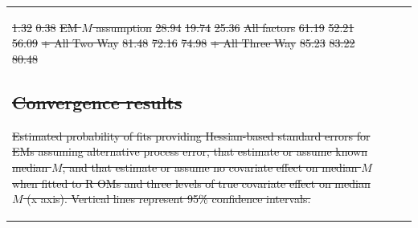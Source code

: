\documentclass[
  12pt,
]{article}
\makeatletter
\providecommand{\DIFdel}[1]{{\protect\color{red}\sout{#1}}} %
\providecommand{\DIFdelFL}[1]{\DIFdel{#1}} %
\let\sout@orig\sout %
\renewcommand{\sout}[1]{\ifmmode\text{\sout@orig{\ensuremath{#1}}}\else\sout@orig{#1}\fi} %
\makeatother
\begin{document}
\begin{table}
{\begin{center}
\begin{tabular}{lrrr}
\DIFdelFL{1.32}%
\DIFdelFL{0.38}%
\DIFdelFL{EM $M$ assumption}%
\DIFdelFL{28.94}%
\DIFdelFL{19.74}%
\DIFdelFL{25.36}%
\DIFdelFL{All factors}%
\DIFdelFL{61.19}%
\DIFdelFL{52.21}%
\DIFdelFL{56.09}%
\DIFdelFL{+ All Two Way}%
\DIFdelFL{81.48}%
\DIFdelFL{72.16}%
\DIFdelFL{74.98}%
\DIFdelFL{+ All Three Way}%
\DIFdelFL{85.23}%
\DIFdelFL{83.22}%
\DIFdelFL{80.48}%


\subsection*{\DIFdel{Convergence results}}%
\addcontentsline{toc}{subsection}{\DIFdel{Convergence results}}

{%
\DIFdelFL{Estimated probability of fits providing Hessian-based standard errors for EMs assuming alternative process error, that estimate or assume known median $M$, and that estimate or assume no covariate effect on median $M$ when fitted to R OMs and three levels of true covariate effect on median $M$ (x axis). Vertical lines represent 95\% confidence intervals.}}%


\end{tabular}
\end{center}}
\end{table}
\end{document}
